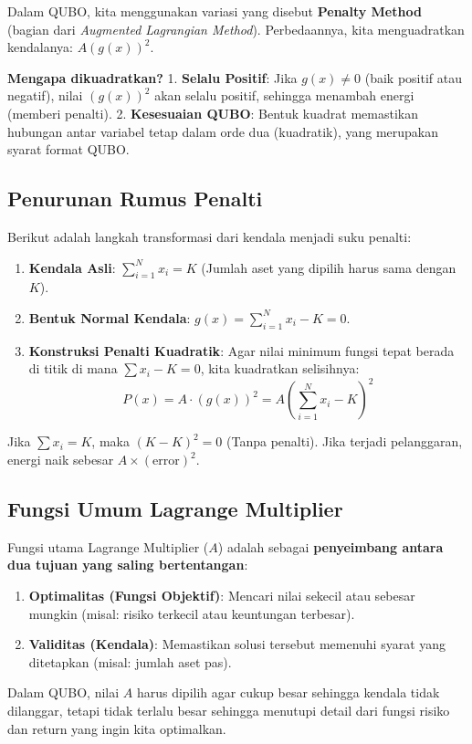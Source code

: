 Dalam QUBO, kita menggunakan variasi yang disebut \textbf{Penalty Method} (bagian dari \emph{Augmented Lagrangian Method}). Perbedaannya, kita menguadratkan kendalanya: \(A(g(x))^2\).

\textbf{Mengapa dikuadratkan?} 1. \textbf{Selalu Positif}: Jika \(g(x) \neq 0\) (baik positif atau negatif), nilai \((g(x))^2\) akan selalu positif, sehingga menambah energi (memberi penalti). 2. \textbf{Kesesuaian QUBO}: Bentuk kuadrat memastikan hubungan antar variabel tetap dalam orde dua (kuadratik), yang merupakan syarat format QUBO.

\hypertarget{penurunan-rumus-penalti}{%
\subsection{Penurunan Rumus Penalti}\label{penurunan-rumus-penalti}}

Berikut adalah langkah transformasi dari kendala menjadi suku penalti:

\begin{enumerate}
\def\labelenumi{\arabic{enumi}.}
\tightlist
\item
  \textbf{Kendala Asli}: \(\sum_{i=1}^N x_i = K\) (Jumlah aset yang dipilih harus sama dengan \(K\)).
\item
  \textbf{Bentuk Normal Kendala}: \(g(x) = \sum_{i=1}^N x_i - K = 0\).
\item
  \textbf{Konstruksi Penalti Kuadratik}: Agar nilai minimum fungsi tepat berada di titik di mana \(\sum x_i - K = 0\), kita kuadratkan selisihnya: \[ P(x) = A \cdot (g(x))^2 = A \left( \sum_{i=1}^N x_i - K \right)^2 \]
\end{enumerate}

Jika \(\sum x_i = K\), maka \((K - K)^2 = 0\) (Tanpa penalti). Jika terjadi pelanggaran, energi naik sebesar \(A \times (\text{error})^2\).

\hypertarget{fungsi-umum-lagrange-multiplier}{%
\subsection{Fungsi Umum Lagrange Multiplier}\label{fungsi-umum-lagrange-multiplier}}

Fungsi utama Lagrange Multiplier (\(A\)) adalah sebagai \textbf{penyeimbang antara dua tujuan yang saling bertentangan}:

\begin{enumerate}
\def\labelenumi{\arabic{enumi}.}
\tightlist
\item
  \textbf{Optimalitas (Fungsi Objektif)}: Mencari nilai sekecil atau sebesar mungkin (misal: risiko terkecil atau keuntungan terbesar).
\item
  \textbf{Validitas (Kendala)}: Memastikan solusi tersebut memenuhi syarat yang ditetapkan (misal: jumlah aset pas).
\end{enumerate}

Dalam QUBO, nilai \(A\) harus dipilih agar cukup besar sehingga kendala tidak dilanggar, tetapi tidak terlalu besar sehingga menutupi detail dari fungsi risiko dan return yang ingin kita optimalkan.
